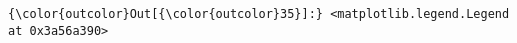 \documentclass[11pt]{article}
\begin{document}
\begin{Verbatim}[commandchars=\\\{\}]
{\color{outcolor}Out[{\color{outcolor}35}]:} <matplotlib.legend.Legend at 0x3a56a390>
\end{Verbatim}
            
    \begin{center}
    \end{center}
    { \hspace*{\fill} \\}
    

    
    
    
    
\end{document}
